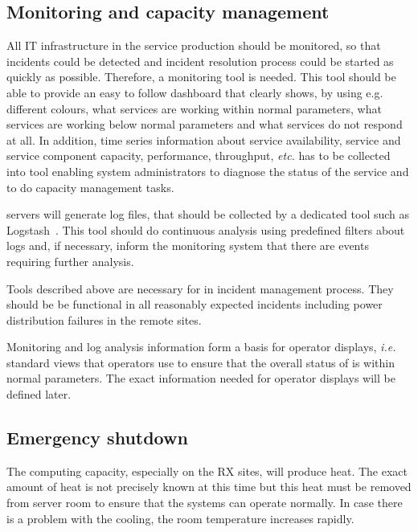 \documentclass[12pt,a4paper]{article}
\begin{document}

\subsection{Monitoring and capacity management}

All IT infrastructure in the \ED service production should be monitored, so that incidents could be detected and incident resolution process could be started as quickly as possible. Therefore, a monitoring tool is needed. 
This tool should be able to provide an easy to follow dashboard that clearly shows, by using e.g. different colours, what services are working within normal parameters, what services are working below normal parameters and what services do not respond at all. 
In addition, time series information about service availability, service and service component  capacity, performance, throughput, \emph{etc.} has to be collected into tool enabling system administrators to diagnose the status of the service and to do capacity management tasks.

\ED servers will generate log files, that should be collected by a dedicated tool such as {Logstash}~\cite{logstash}. 
This tool should do continuous analysis using predefined filters about logs and, if necessary, inform the monitoring system that there are events requiring further analysis.

Tools described above are necessary for  in incident management process.
They should be be functional in all reasonably expected incidents including power distribution failures in the remote sites. 

Monitoring and log analysis information form a basis for
operator displays, \emph{i.e.} standard views that operators use to ensure that the overall status of \ED is within normal parameters. 
The exact information needed for operator displays will be defined later.

\subsection{Emergency shutdown}

The computing capacity, especially on the RX sites, will produce heat. 
The exact amount of heat is not precisely known at this time but this heat must be removed from server room to ensure that the systems can operate normally.
In case there is a problem with the cooling, the room temperature increases rapidly. 
\end{document}
